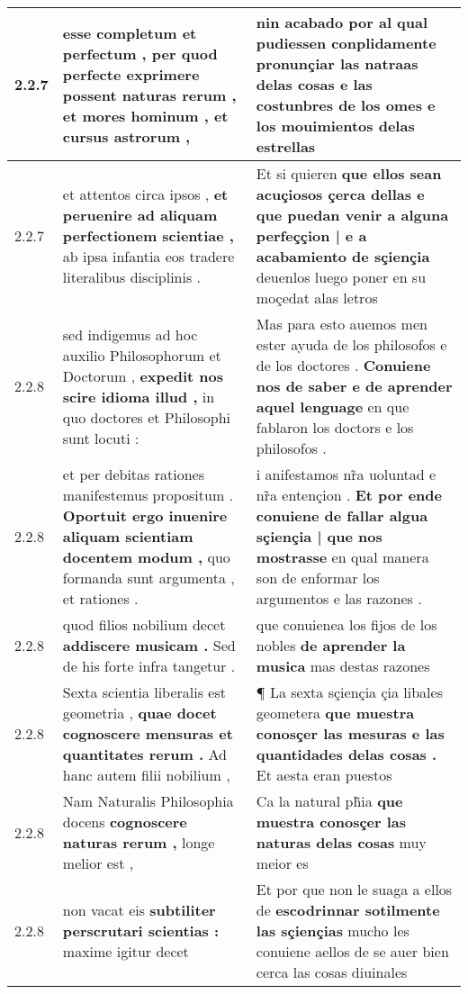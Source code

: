 \begin{tabular}{|p{1cm}|p{6.5cm}|p{6.5cm}|}
2.2.7 & esse completum et perfectum , \textbf{ per quod perfecte exprimere possent naturas rerum , } et mores hominum , et cursus astrorum , & nin acabado \textbf{ por al qual pudiessen conplidamente pronunçiar las natraas delas cosas e las costunbres de los omes } e los mouimientos delas estrellas \\\hline
2.2.7 & et attentos circa ipsos , \textbf{ et peruenire ad aliquam perfectionem scientiae , } ab ipsa infantia eos tradere literalibus disciplinis . & Et si quieren \textbf{ que ellos sean acuçiosos çerca dellas e que puedan venir a alguna perfeççion | e a acabamiento de sçiençia } deuenlos luego poner en su moçedat alas letros \\\hline
2.2.8 & sed indigemus ad hoc auxilio Philosophorum et Doctorum , \textbf{ expedit nos scire idioma illud , } in quo doctores et Philosophi sunt locuti : & Mas para esto auemos men ester ayuda de los philosofos e de los doctores . \textbf{ Conuiene nos de saber e de aprender aquel lenguage } en que fablaron los doctors e los philosofos . \\\hline
2.2.8 & et per debitas rationes manifestemus propositum . \textbf{ Oportuit ergo inuenire aliquam scientiam docentem modum , } quo formanda sunt argumenta , et rationes . & i anifestamos nr̃a uoluntad e nr̃a entençion . \textbf{ Et por ende conuiene de fallar algua sçiençia | que nos mostrasse } en qual manera son de enformar los argumentos e las razones . \\\hline
2.2.8 & quod filios nobilium decet \textbf{ addiscere musicam . } Sed de his forte infra tangetur . & que conuienea los fijos de los nobles \textbf{ de aprender la musica } mas destas razones \\\hline
2.2.8 & Sexta scientia liberalis est geometria , \textbf{ quae docet cognoscere mensuras et quantitates rerum . } Ad hanc autem filii nobilium , & ¶ La sexta sçiençia çia libales geometera \textbf{ que muestra conosçer las mesuras e las quantidades delas cosas . } Et aesta eran puestos \\\hline
2.2.8 & Nam Naturalis Philosophia docens \textbf{ cognoscere naturas rerum , } longe melior est , & Ca la natural ph̃ia \textbf{ que muestra conosçer las naturas delas cosas } muy meior es \\\hline
2.2.8 & non vacat eis \textbf{ subtiliter perscrutari scientias : } maxime igitur decet & Et por que non le suaga a ellos de \textbf{ escodrinnar sotilmente las sçiençias } mucho les conuiene aellos de se auer bien cerca las cosas diuinales \\\hline

\end{tabular}
